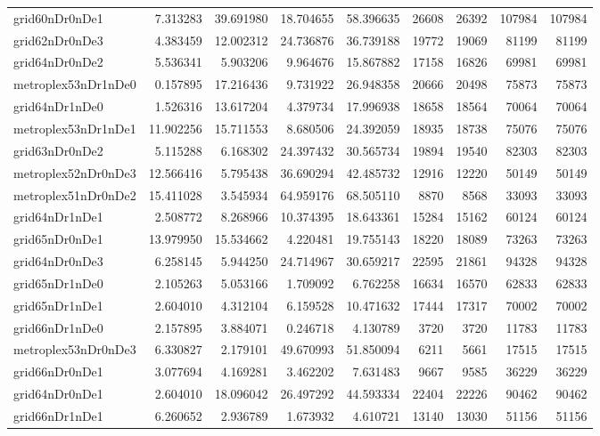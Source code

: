 \begin{longtable}{|l|r|r|r|r|r|r|r|r|}
grid60nDr0nDe1 & 7.313283 & 39.691980 & 18.704655 & 58.396635 & 26608 & 26392 & 107984 & 107984 \\
grid62nDr0nDe3 & 4.383459 & 12.002312 & 24.736876 & 36.739188 & 19772 & 19069 & 81199 & 81199 \\
grid64nDr0nDe2 & 5.536341 & 5.903206 & 9.964676 & 15.867882 & 17158 & 16826 & 69981 & 69981 \\
metroplex53nDr1nDe0 & 0.157895 & 17.216436 & 9.731922 & 26.948358 & 20666 & 20498 & 75873 & 75873 \\
grid64nDr1nDe0 & 1.526316 & 13.617204 & 4.379734 & 17.996938 & 18658 & 18564 & 70064 & 70064 \\
metroplex53nDr1nDe1 & 11.902256 & 15.711553 & 8.680506 & 24.392059 & 18935 & 18738 & 75076 & 75076 \\
grid63nDr0nDe2 & 5.115288 & 6.168302 & 24.397432 & 30.565734 & 19894 & 19540 & 82303 & 82303 \\
metroplex52nDr0nDe3 & 12.566416 & 5.795438 & 36.690294 & 42.485732 & 12916 & 12220 & 50149 & 50149 \\
metroplex51nDr0nDe2 & 15.411028 & 3.545934 & 64.959176 & 68.505110 & 8870 & 8568 & 33093 & 33093 \\
grid64nDr1nDe1 & 2.508772 & 8.268966 & 10.374395 & 18.643361 & 15284 & 15162 & 60124 & 60124 \\
grid65nDr0nDe1 & 13.979950 & 15.534662 & 4.220481 & 19.755143 & 18220 & 18089 & 73263 & 73263 \\
grid64nDr0nDe3 & 6.258145 & 5.944250 & 24.714967 & 30.659217 & 22595 & 21861 & 94328 & 94328 \\
grid65nDr1nDe0 & 2.105263 & 5.053166 & 1.709092 & 6.762258 & 16634 & 16570 & 62833 & 62833 \\
grid65nDr1nDe1 & 2.604010 & 4.312104 & 6.159528 & 10.471632 & 17444 & 17317 & 70002 & 70002 \\
grid66nDr1nDe0 & 2.157895 & 3.884071 & 0.246718 & 4.130789 & 3720 & 3720 & 11783 & 11783 \\
metroplex53nDr0nDe3 & 6.330827 & 2.179101 & 49.670993 & 51.850094 & 6211 & 5661 & 17515 & 17515 \\
grid66nDr0nDe1 & 3.077694 & 4.169281 & 3.462202 & 7.631483 & 9667 & 9585 & 36229 & 36229 \\
grid64nDr0nDe1 & 2.604010 & 18.096042 & 26.497292 & 44.593334 & 22404 & 22226 & 90462 & 90462 \\
grid66nDr1nDe1 & 6.260652 & 2.936789 & 1.673932 & 4.610721 & 13140 & 13030 & 51156 & 51156 \\

\end{longtable}

